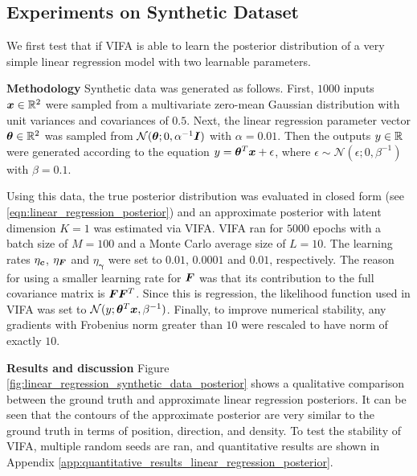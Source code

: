 \documentclass[10pt]{article} %
\newcommand{\vgamma}{\bm{\gamma}}
\begin{document}
\subsection{Experiments on Synthetic Dataset}
\label{sec:experiments_on_synthetic_data}
We first test that if VIFA is able to learn the posterior distribution of a very simple linear regression model with two learnable parameters.

\textbf{Methodology} Synthetic data was generated as follows. First, $1000$ inputs ${\bm{x}} \in \mathbb{R}^2$ were sampled from a multivariate zero-mean Gaussian distribution with unit variances and covariances of $0.5$. Next, the linear regression parameter vector ${\bm{\theta}} \in \mathbb{R}^2$ was sampled from $\mathcal{N} ( {\bm{\theta}} ; 0, \alpha^{-1} {\bm{I}})$ with $\alpha = 0.01$. Then the outputs $y \in \mathbb{R}$ were generated according to the equation $y = {\bm{\theta}}^T {\bm{x}} + \epsilon$, where $\epsilon \sim \mathcal{N} ( \epsilon ; 0, \beta^{-1})$ with $\beta = 0.1$.

Using this data, the true posterior distribution was evaluated in closed form (see \ref{eqn:linear_regression_posterior}) and an approximate posterior with latent dimension $K=1$ was estimated via VIFA. VIFA ran for $5000$ epochs with a batch size of $M=100$ and a Monte Carlo average size of $L=10$.  The learning rates $\eta_{\bm{c}}$,  $\eta_{\bm{F}}$ and $\eta_{\vgamma}$ were set to $0.01$, $0.0001$ and $0.01$, respectively. The reason for using a smaller learning rate for ${\bm{F}}$ was that its contribution to the full covariance matrix is ${\bm{F}}{\bm{F}}^T$. Since this is regression, the likelihood function used in VIFA was set to $\mathcal{N} (y; {\bm{\theta}}^T {\bm{x}}, \beta^{-1})$. Finally, to improve numerical stability, any gradients with Frobenius norm greater than $10$ were rescaled to have norm of exactly $10$.

\textbf{Results and discussion} Figure \ref{fig:linear_regression_synthetic_data_posterior} shows a qualitative comparison between the ground truth and approximate linear regression posteriors. It can be seen that the contours of the approximate posterior are very similar to the ground truth in terms of position, direction, and density. To test the stability of VIFA, multiple random seeds are ran, and quantitative results are shown in Appendix \ref{app:quantitative_results_linear_regression_posterior}.
\end{document}
